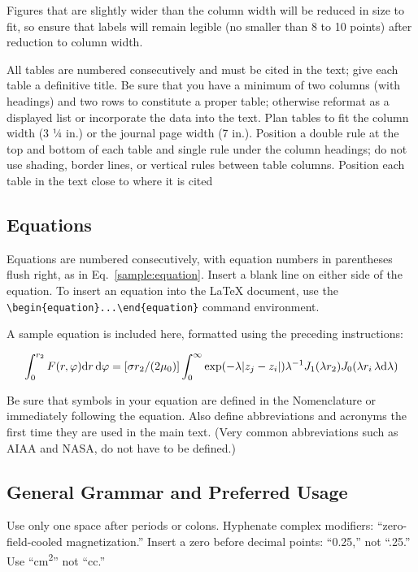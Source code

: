 \documentclass[journal ]{new-aiaa}
\begin{document}
Figures that are slightly wider than the column width will be reduced in size to fit, so ensure that labels will remain legible (no smaller than 8 to 10 points) after reduction to column width. 

All tables are numbered consecutively and must be cited in the text; give each table a definitive title. Be sure that you have a minimum of two columns (with headings) and two rows to constitute a proper table; otherwise reformat as a displayed list or incorporate the data into the text. Plan tables to fit the column width (3 ¼ in.) or the journal page width (7 in.). Position a double rule at the top and bottom of each table and single rule under the column headings; do not use shading, border lines, or vertical rules between table columns. Position each table in the text close to where it is cited


\subsection{Equations}
Equations are numbered consecutively, with equation numbers in parentheses flush right, as in Eq.~\eqref{sample:equation}. Insert a blank line on either side of the equation. To insert an equation into the \LaTeX{} document, use the \verb|\begin{equation}...\end{equation}| command environment.

A sample equation is included here, formatted using the preceding instructions:

\begin{equation}
\label{sample:equation}
\int^{r_2}_0 F(r,\varphi){\rm d}r\,{\rm d}\varphi = [\sigma r_2/(2\mu_0)]\int^{\infty}_0\exp(-\lambda|z_j-z_i|)\lambda^{-1}J_1 (\lambda r_2)J_0 (\lambda r_i\,\lambda {\rm d}\lambda)
\end{equation}

Be sure that symbols in your equation are defined in the Nomenclature or immediately following the equation. Also define abbreviations and acronyms the first time they are used in the main text. (Very common abbreviations such as AIAA and NASA, do not have to be defined.)

\subsection{General Grammar and Preferred Usage}
Use only one space after periods or colons. Hyphenate complex modifiers: ``zero-field-cooled magnetization.'' Insert a zero before decimal points: ``0.25,'' not ``.25.'' Use ``\si{\centi\meter\squared}'' not ``cc.'' 
\end{document}
